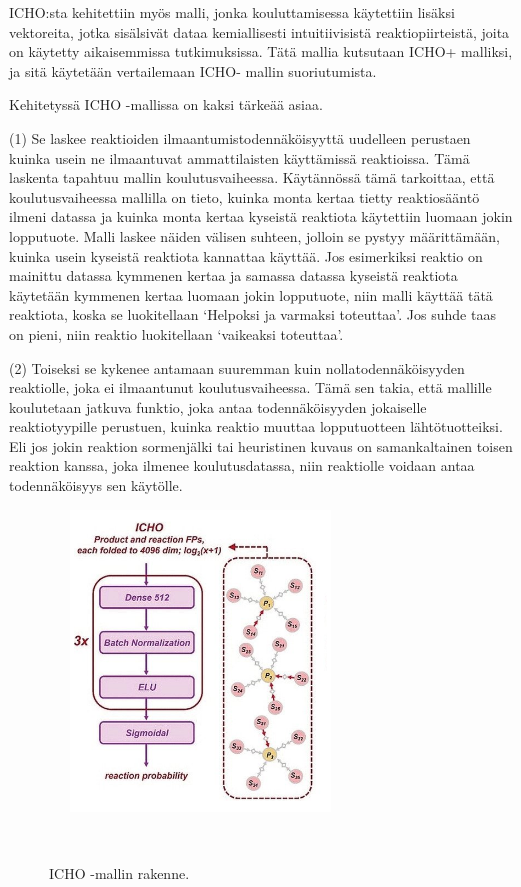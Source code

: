 \documentclass[finnish,twoside,censored,tkt,sw-line]{HYthesisML}
\begin{document}
ICHO:sta kehitettiin myös malli, jonka kouluttamisessa käytettiin lisäksi vektoreita, jotka sisälsivät dataa kemiallisesti intuitiivisistä reaktiopiirteistä, joita on käytetty aikaisemmissa tutkimuksissa.
Tätä mallia kutsutaan ICHO+ malliksi, ja sitä käytetään vertailemaan ICHO- mallin suoriutumista.

Kehitetyssä ICHO -mallissa on kaksi tärkeää asiaa.

(1) Se laskee reaktioiden ilmaantumistodennäköisyyttä uudelleen perustaen kuinka usein ne ilmaantuvat ammattilaisten käyttämissä reaktioissa.
Tämä laskenta tapahtuu mallin koulutusvaiheessa.
Käytännössä tämä tarkoittaa, että koulutusvaiheessa mallilla on tieto, kuinka monta kertaa tietty reaktiosääntö ilmeni datassa ja kuinka monta kertaa kyseistä reaktiota käytettiin luomaan jokin lopputuote.
Malli laskee näiden välisen suhteen, jolloin se pystyy määrittämään, kuinka usein kyseistä reaktiota kannattaa käyttää.
Jos esimerkiksi reaktio on mainittu datassa kymmenen kertaa ja samassa datassa kyseistä reaktiota käytetään kymmenen kertaa luomaan jokin lopputuote, niin malli käyttää tätä reaktiota, koska se luokitellaan `Helpoksi ja varmaksi toteuttaa'.
Jos suhde taas on pieni, niin reaktio luokitellaan `vaikeaksi toteuttaa'.

(2) Toiseksi se kykenee antamaan suuremman kuin nollatodennäköisyyden reaktiolle, joka ei ilmaantunut koulutusvaiheessa.
Tämä sen takia, että mallille koulutetaan jatkuva funktio, joka antaa todennäköisyyden jokaiselle reaktiotyypille perustuen, kuinka reaktio muuttaa lopputuotteen lähtötuotteiksi.
Eli jos jokin reaktion sormenjälki tai heuristinen kuvaus on samankaltainen toisen reaktion kanssa, joka ilmenee koulutusdatassa, niin reaktiolle voidaan antaa todennäköisyys sen käytölle.

\begin{figure}[!ht]
    \centering
    \includegraphics[width=8cm, height=8cm]{icho-neuralnetwork.png}
    \caption{ICHO -mallin rakenne.}
    {~\cite{ExpertKnowledgeRetorsynthesis}}
    \label{fig:icho-neuralnetwork}
\end{figure}
\end{document}
